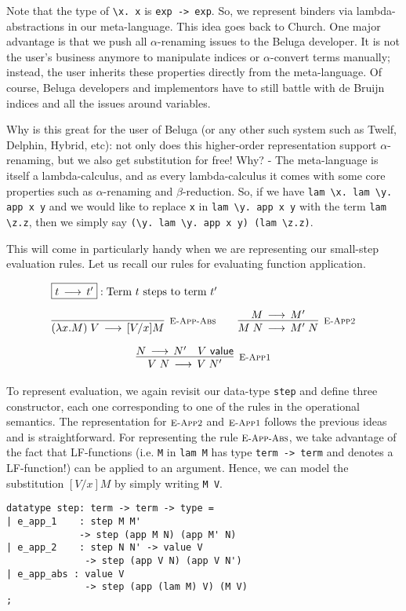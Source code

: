 Note that the type of \lstinline!\x. x! is \lstinline!exp -> exp!. So,
we represent binders  via lambda-abstractions in our
meta-language. This idea goes back to Church. One major advantage is
that we push all $\alpha$-renaming issues to the Beluga developer. It
is not the user's business anymore to manipulate indices or
$\alpha$-convert terms manually; instead, the user inherits these
properties directly from the meta-language. Of course, Beluga developers and
implementors have to still battle with de Bruijn indices and all the issues
around variables.

Why is this great for the user of Beluga (or any other such system such as Twelf, Delphin, Hybrid, etc): not only does this higher-order representation support $\alpha$-renaming, but we also get substitution for free! Why?  - The meta-language is itself a lambda-calculus, and as every lambda-calculus it comes with some core properties such as $\alpha$-renaming and $\beta$-reduction. So, if we
have \lstinline!lam \x. lam \y. app x y! and we would like to replace
\lstinline!x! in \lstinline!lam \y. app x y! with the term
\lstinline!lam \z.z!, then we simply say
\lstinline!(\y. lam \y. app x y) (lam \z.z)!.

This will come in particularly handy when we are representing our small-step
evaluation rules. Let us recall our rules for evaluating function application.

\[
\begin{array}{c}
\multicolumn{1}{l}{\fbox{$t \Steps t'$}: \mbox{Term $t$ steps to term $t'$}}
\\[1em]
\infer[\EAppBeta]{(\lam x.M) \app V \Steps [V/x]M}{} \qquad
\infer[\EAppArgStep]{M \app N \Steps M'\;N}{M \Steps M'} \\[1em]
\infer[\EAppFnStep]{V \app N \Steps V\;N'}{N \Steps N' & V \Value}
\end{array}
\]

To represent evaluation, we again revisit our data-type
\lstinline!step! and define three constructor, each one corresponding to one of
the rules in the operational semantics. The representation for $\textsc{\footnotesize E-App2}$
and $\textsc{\footnotesize E-App1}$ follows the previous ideas and is straightforward. For
representing the rule $\textsc{\footnotesize E-App-Abs}$, we take advantage of the fact that
LF-functions (i.e. \lstinline!M! in \lstinline!lam M! has type
\lstinline!term -> term! and denotes a LF-function!) can be applied to an
argument. Hence, we can model the substitution $[V/x]M$ by simply writing
\lstinline!M V!.

\begin{lstlisting}
datatype step: term -> term -> type =
| e_app_1    : step M M'
             -> step (app M N) (app M' N)
| e_app_2    : step N N' -> value V
              -> step (app V N) (app V N')
| e_app_abs : value V
              -> step (app (lam M) V) (M V)
;
\end{lstlisting}

